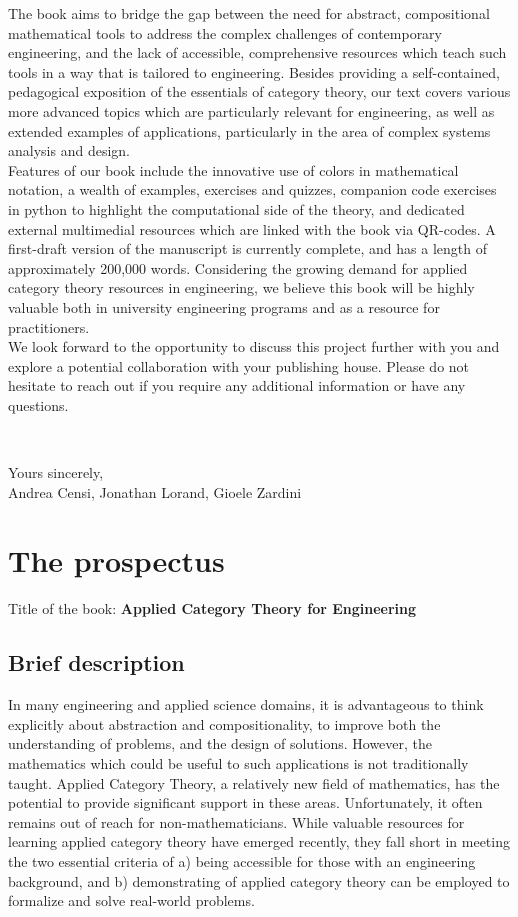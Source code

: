 \documentclass[10pt, article, one side]{memoir}
\begin{document}
    The book aims to bridge the gap between the need for abstract, compositional mathematical tools to address the complex challenges of contemporary engineering, and the lack of accessible, comprehensive resources which teach such tools in a way that is tailored to engineering. Besides providing a self-contained, pedagogical exposition of the essentials of category theory, our text covers various more advanced topics which are particularly relevant for engineering, as well as extended examples of applications, particularly in the area of complex systems analysis and design. \\[-7pt]
     
    Features of our book include the innovative use of colors in mathematical notation, a wealth of examples, exercises and quizzes, companion code exercises in python to highlight the computational side of the theory, and dedicated external multimedial resources which are linked with the book via QR-codes. A first-draft version of the manuscript is currently complete, and has a length of approximately 200,000 words. Considering the growing demand for applied category theory resources in engineering, we believe this book will be highly valuable both in university engineering programs and as a resource for practitioners.
    \\[-7pt]
    
    We look forward to the opportunity to discuss this project further with you and explore a potential collaboration with your publishing house.
    Please do not hesitate to reach out if you require any additional information or have any questions.

\


    \noindent Yours sincerely,\\

    \noindent \hspace{8cm}
    Andrea Censi, Jonathan Lorand, Gioele Zardini

    \newpage

    \chapter{The prospectus}
    Title of the book: \textbf{Applied Category Theory for Engineering}
    \section{Brief description}
    In many engineering and applied science domains, it is advantageous to think explicitly about abstraction and compositionality, to improve both the understanding of problems, and the design of solutions.
    However, the mathematics which could be useful to such applications is not traditionally taught.
    Applied Category Theory, a relatively new field of mathematics, has the potential to provide significant support in these areas.
    Unfortunately, it often remains out of reach for non-mathematicians.
    While valuable resources for learning applied category theory have emerged recently, they fall short in meeting the two essential criteria of a) being accessible for those with an engineering background, and b) demonstrating of applied category theory can be employed to formalize and solve real-world problems.
\end{document}
